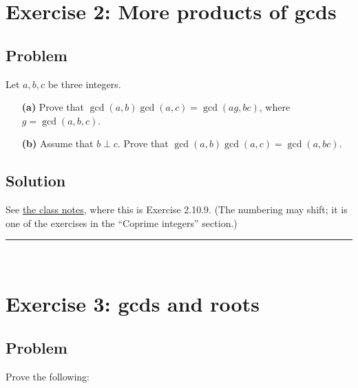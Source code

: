 \documentclass[paper=a4, fontsize=12pt]{scrartcl} %
\newcommand{\tup}[1]{\left( #1 \right)}
\newcommand{\horrule}[1]{\rule{\linewidth}{#1}} %
\theoremstyle{plainsl}
\theoremstyle{definition}
\theoremstyle{remark}
\begin{document}
\section{Exercise 2: More products of gcds}

\subsection{Problem}

Let $a, b, c$ be three integers.

\begin{enumerate}

\item[\textbf{(a)}]
Prove that
$\gcd\tup{a, b} \gcd\tup{a, c}
= \gcd\tup{ag, bc}$,
where $g = \gcd\tup{a, b, c}$.

\item[\textbf{(b)}]
Assume that $b \perp c$.
Prove that
$\gcd\tup{a, b} \gcd\tup{a, c} = \gcd\tup{a, bc}$.

\end{enumerate}

\subsection{Solution}

See
\href{http://www-users.math.umn.edu/~dgrinber/19s/notes.pdf}{the class notes},
where this is Exercise 2.10.9. (The numbering may shift; it is one of the
exercises in the
``Coprime integers''
section.)

\horrule{0.3pt} \\[0.4cm]

\section{Exercise 3: gcds and roots}

\subsection{Problem}

Prove the following:
\end{document}
